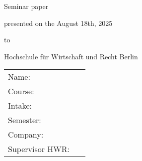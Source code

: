 
\thispagestyle{empty}

\begin{center}
	\huge\topic

	
	\vspace{1.5cm}
	\normalsize{
	Seminar paper

	\vspace{1.5cm}
	presented on the August 18th, 2025

	\vspace{1.5cm}
	to

	\vspace{1.5cm}
	Hochschule für Wirtschaft und Recht Berlin
}

\end{center}	

\vspace{1.5cm}

\renewcommand{\arraystretch}{2}
\begin{tabular}{l l}
	Name: & \studentfirstname~\studentlastname \tabularnewline
	Course: & \course \tabularnewline
	Intake: & \intake \tabularnewline
	Semester: & \semester \tabularnewline
	Company: & \company \tabularnewline
	Supervisor HWR: & \supervisorhwr \tabularnewline
\end{tabular}

	

